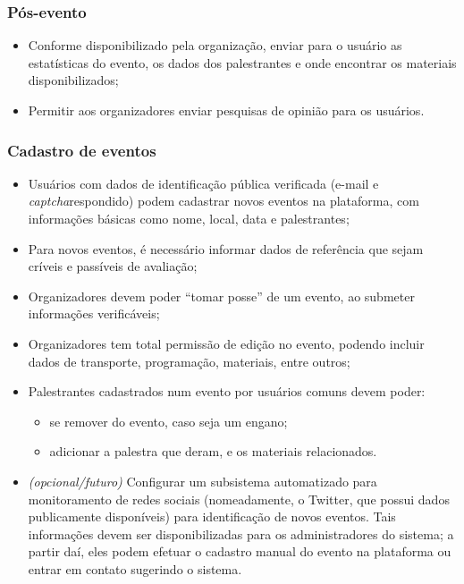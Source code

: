 \documentclass[12pt,a4paper,twoside,hyphens,english,brazil]{abntex2}
\begin{document}
\subsubsection*{Pós-evento}
\begin{itemize}
	\item Conforme disponibilizado pela organização, enviar para o usuário as estatísticas do evento, os dados dos palestrantes e onde encontrar os materiais disponibilizados;
	\item Permitir aos organizadores enviar pesquisas de opinião para os usuários.
\end{itemize}

\subsubsection*{Cadastro de eventos}
\begin{itemize}
	\item Usuários com dados de identificação pública verificada (e-mail e \emph{captcha}\footnotemark respondido) podem cadastrar novos eventos na plataforma, com informações básicas como nome, local, data e palestrantes;
	\item Para novos eventos, é necessário informar dados de referência que sejam críveis e passíveis de avaliação;
	\item Organizadores devem poder ``tomar posse'' de um evento, ao submeter informações verificáveis;
	\item Organizadores tem total permissão de edição no evento, podendo incluir dados de transporte, programação, materiais, entre outros;
	\item Palestrantes cadastrados num evento por usuários comuns devem poder:
		\begin{itemize}
			\item se remover do evento, caso seja um engano;
			\item adicionar a palestra que deram, e os materiais relacionados.
		\end{itemize}
	\item \textit{(opcional/futuro)} Configurar um subsistema automatizado para monitoramento de redes sociais (nomeadamente, o Twitter, que possui dados publicamente disponíveis) para identificação de novos eventos. Tais informações devem ser disponibilizadas para os administradores do sistema; a partir daí, eles podem efetuar o cadastro manual do evento na plataforma ou entrar em contato sugerindo o sistema.
\end{itemize}
\end{document}
